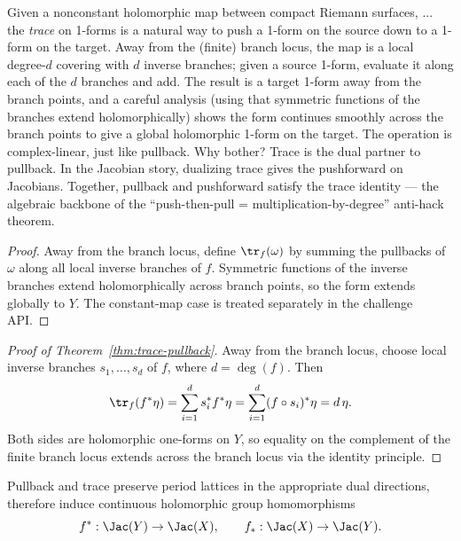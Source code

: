 \begin{layman}
Given a nonconstant holomorphic map between compact Riemann surfaces,
...
the \emph{trace} on 1-forms is a natural way to push a 1-form on the
source down to a 1-form on the target. Away from the (finite) branch
locus, the map is a local degree-\(d\) covering with \(d\) inverse
branches; given a source 1-form, evaluate it along each of the \(d\)
branches and add. The result is a target 1-form away from the branch
points, and a careful analysis (using that symmetric functions of the
branches extend holomorphically) shows the form continues smoothly
across the branch points to give a global holomorphic 1-form on the
target. The operation is complex-linear, just like pullback. Why
bother? Trace is the dual partner to pullback. In the Jacobian story,
dualizing trace gives the pushforward on Jacobians. Together,
pullback and pushforward satisfy the trace identity --- the algebraic
backbone of the ``push-then-pull = multiplication-by-degree''
anti-hack theorem.
\end{layman}

\begin{proof}\leanok
Away from the branch locus, define \(\tr_f(\omega)\) by summing the pullbacks
of \(\omega\) along all local inverse branches of \(f\). Symmetric functions
of the inverse branches extend holomorphically across branch points, so the
form extends globally to \(Y\). The constant-map case is treated separately in
the challenge API.
\end{proof}

\begin{proof}[Proof of Theorem~\ref{thm:trace-pullback}]\leanok
Away from the branch locus, choose local inverse branches
\(s_1,\dots,s_d\) of \(f\), where \(d=\deg(f)\). Then
\[
  \tr_f(f^{*}\eta)
  =
  \sum_{i=1}^{d}s_i^{*}f^{*}\eta
  =
  \sum_{i=1}^{d}(f\circ s_i)^{*}\eta
  =
  d\,\eta.
\]
Both sides are holomorphic one-forms on \(Y\), so equality on the complement
of the finite branch locus extends across the branch locus via the identity principle.
\end{proof}

\begin{lemma}
\label{lem:push-pull-descend}
Pullback and trace preserve period lattices in the appropriate dual directions,
therefore induce continuous holomorphic group homomorphisms
\[
  f^{*}:\Jac(Y)\to\Jac(X), \qquad f_*:\Jac(X)\to\Jac(Y).
\]
\leanok
\end{lemma}

